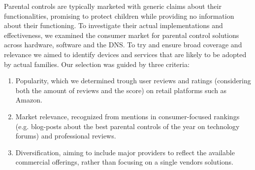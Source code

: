 Parental controls are typically marketed with generic claims about their functionalities, promising to protect children while providing no information about their functioning.
To investigate their actual implementations and effectiveness, we examined the consumer market for parental control solutions across hardware, software and the DNS. 
To try and ensure broad coverage and relevance we aimed to identify devices and services that are likely to be adopted by actual families. 
Our selection was guided by three criteria:

\begin{enumerate}
\item Popularity, which we determined trough user reviews and ratings (considering both the amount of reviews and the score) on retail platforms such as Amazon. 
\item  Market relevance, recognized from mentions in consumer-focused rankings (e.g. blog-posts about the best parental controls of the year on technology forums) and professional reviews.
\item Diversification, aiming to include major providers to reflect the available commercial offerings, rather than focusing on a single vendors solutions.
\end{enumerate}



